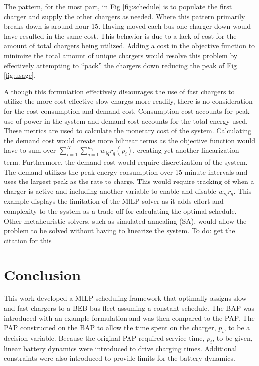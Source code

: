 \documentclass[utf8]{FrontiersinHarvard}
\newcommand{\TODO}[1]{{\color{green} To do: #1}}                                %
\begin{document}
The pattern, for the most part, in Fig \ref{fig:schedule} is to populate the first charger and supply the other chargers
as needed. Where this pattern primarily breaks down is around hour 15. Having moved each bus one charger down would have
resulted in the same cost. This behavior is due to a lack of cost for the amount of total chargers being utilized.
Adding a cost in the objective function to minimize the total amount of unique chargers would resolve this problem by
effectively attempting to ``pack'' the chargers down reducing the peak of Fig \ref{fig:usage}.

Although this formulation effectively discourages the use of fast chargers to utilize the more cost-effective slow
charges more readily, there is no consideration for the cost consumption and demand cost. Consumption cost accounts for
peak use of power in the system and demand cost accounts for the total energy used. These metrics are used to calculate
the monetary cost of the system. Calculating the demand cost would create more bilinear terms as the objective function
would have to sum over $\sum_{i=1}^N \sum_{q=1}^{n_Q} w_{iq}{r_q}(p_i)$, creating yet another linearization term. Furthermore, the
demand cost would require discretization of the system. The demand utilizes the peak energy consumption over 15 minute
intervals and uses the largest peak as the rate to charge. This would require tracking of when a charger is active and
including another variable to enable and disable $w_{iq}r_q$. This example displays the limitation of the MILP solver as
it adds effort and complexity to the system as a trade-off for calculating the optimal schedule. Other metaheuristic
solvers, such as simulated annealing (SA), would allow the problem to be solved without having to linearize the system.
\TODO{get the citation for this}

\section{Conclusion}
\label{sec:conclusion}
This work developed a MILP scheduling framework that optimally assigns slow and fast chargers to a BEB bus fleet
assuming a constant schedule. The BAP was introduced with an example formulation and was then compared to the PAP. The
PAP constructed on the BAP to allow the time spent on the charger, $p_i$, to be a decision variable. Because the
original PAP required service time, $p_i$, to be given, linear battery dynamics were introduced to drive charging times.
Additional constraints were also introduced to provide limits for the battery dynamics.
\end{document}
